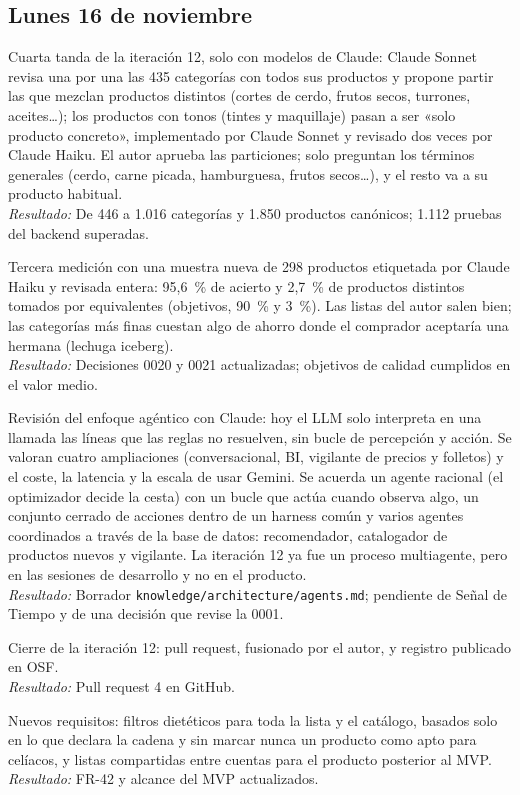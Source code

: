 \documentclass[11pt,a4paper]{article}
\newcommand{\actividad}[3]{\item[\textbf{[#1]}] #2 \\ \textit{Resultado:} #3}
\begin{document}
	\subsection*{Lunes 16 de noviembre}
	\begin{description}[leftmargin=0pt, itemsep=6pt]
		\actividad{Tarea}{Cuarta tanda de la iteración 12, solo con modelos de Claude: Claude Sonnet revisa una por una las 435 categorías con todos sus productos y propone partir las que mezclan productos distintos (cortes de cerdo, frutos secos, turrones, aceites…); los productos con tonos (tintes y maquillaje) pasan a ser «solo producto concreto», implementado por Claude Sonnet y revisado dos veces por Claude Haiku. El autor aprueba las particiones; solo preguntan los términos generales (cerdo, carne picada, hamburguesa, frutos secos…), y el resto va a su producto habitual.}{De 446 a 1.016 categorías y 1.850 productos canónicos; 1.112 pruebas del backend superadas.}
		\actividad{Análisis}{Tercera medición con una muestra nueva de 298 productos etiquetada por Claude Haiku y revisada entera: 95,6~\% de acierto y 2,7~\% de productos distintos tomados por equivalentes (objetivos, 90~\% y 3~\%). Las listas del autor salen bien; las categorías más finas cuestan algo de ahorro donde el comprador aceptaría una hermana (lechuga iceberg).}{Decisiones 0020 y 0021 actualizadas; objetivos de calidad cumplidos en el valor medio.}
		\actividad{Análisis}{Revisión del enfoque agéntico con Claude: hoy el LLM solo interpreta en una llamada las líneas que las reglas no resuelven, sin bucle de percepción y acción. Se valoran cuatro ampliaciones (conversacional, BI, vigilante de precios y folletos) y el coste, la latencia y la escala de usar Gemini. Se acuerda un agente racional (el optimizador decide la cesta) con un bucle que actúa cuando observa algo, un conjunto cerrado de acciones dentro de un harness común y varios agentes coordinados a través de la base de datos: recomendador, catalogador de productos nuevos y vigilante. La iteración 12 ya fue un proceso multiagente, pero en las sesiones de desarrollo y no en el producto.}{Borrador \texttt{knowledge/architecture/agents.md}; pendiente de Señal de Tiempo y de una decisión que revise la 0001.}
		\actividad{Tarea}{Cierre de la iteración 12: pull request, fusionado por el autor, y registro publicado en OSF.}{Pull request 4 en GitHub.}
		\actividad{Documentación}{Nuevos requisitos: filtros dietéticos para toda la lista y el catálogo, basados solo en lo que declara la cadena y sin marcar nunca un producto como apto para celíacos, y listas compartidas entre cuentas para el producto posterior al MVP.}{FR-42 y alcance del MVP actualizados.}

\end{description}
\end{document}

